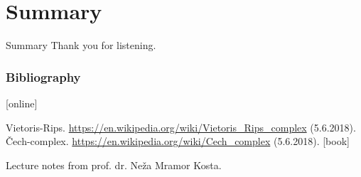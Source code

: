 \documentclass{beamer}
\begin{document}
\section*{Summary}

\begin{frame}{Summary}
Thank you for listening. 
\end{frame}





\begin{frame}
  \frametitle<presentation>{Bibliography}
    
  \begin{thebibliography}{99}

  [online]
  	 
  Vietoris-Rips. \url{https://en.wikipedia.org/wiki/Vietoris_Rips_complex} (5.6.2018).
  Čech-complex. \url{https://en.wikipedia.org/wiki/Cech_complex} (5.6.2018).
  [book]
 	
   Lecture notes from prof. dr. Neža Mramor Kosta.
  \end{thebibliography}
\end{frame}
\end{document}
